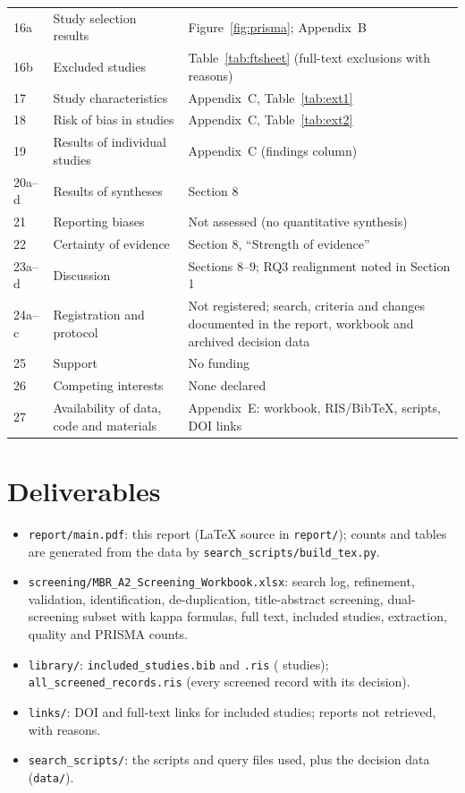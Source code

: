 {\begin{longtable}{@{}P{0.9cm}P{5.6cm}P{9.4cm}@{}}
16a & Study selection results & Figure~\ref{fig:prisma}; Appendix~B \\
16b & Excluded studies & Table~\ref{tab:ftsheet} (full-text exclusions with reasons) \\
17 & Study characteristics & Appendix~C, Table~\ref{tab:ext1} \\
18 & Risk of bias in studies & Appendix~C, Table~\ref{tab:ext2} \\
19 & Results of individual studies & Appendix~C (findings column) \\
20a--d & Results of syntheses & Section 8 \\
21 & Reporting biases & Not assessed (no quantitative synthesis) \\
22 & Certainty of evidence & Section 8, ``Strength of evidence'' \\
23a--d & Discussion & Sections 8--9; RQ3 realignment noted in Section 1 \\
24a--c & Registration and protocol & Not registered; search, criteria and changes documented in the report, workbook and archived decision data \\
25 & Support & No funding \\
26 & Competing interests & None declared \\
27 & Availability of data, code and materials & Appendix~E: workbook, RIS/BibTeX, scripts, DOI links \\
\end{longtable}}

\section{Deliverables}
\begin{itemize}
\item \texttt{report/main.pdf}: this report (LaTeX source in \texttt{report/}); counts and tables are generated from the data by \texttt{search\_scripts/build\_tex.py}.
\item \texttt{screening/MBR\_A2\_Screening\_Workbook.xlsx}: search log, refinement, validation, identification, de-duplication, title-abstract screening, dual-screening subset with kappa formulas, full text, included studies, extraction, quality and PRISMA counts.
\item \texttt{library/}: \texttt{included\_studies.bib} and \texttt{.ris} (\totalIncluded{} studies); \texttt{all\_screened\_records.ris} (every screened record with its decision).
\item \texttt{links/}: DOI and full-text links for included studies; reports not retrieved, with reasons.
\item \texttt{search\_scripts/}: the scripts and query files used, plus the decision data (\texttt{data/}).
\end{itemize}

